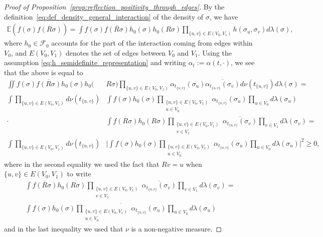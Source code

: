 \documentclass[12pt,reqno]{article}
\def\E{\mathbb{E}}
\newcommand{\cF}{\mathcal{F}}
\begin{document}
\begin{proof}[Proof of Proposition~\ref{prop:reflection_positivity_through_edges}]
	By the definition~\eqref{eq:def_density_general_interaction} of the density of $\sigma$, we have
	\begin{align*}
	\E\left(f(\sigma) \overline{f(R\sigma)}\right) = \int f(\sigma) \overline{f(R\sigma)} h_0(\sigma) h_0(R\sigma) \prod_{\{u,v\} \in E(V_0,V_1)} h(\sigma_u,\sigma_v) d\lambda(\sigma) ,
	\end{align*}
	where $h_0 \in \cF_0$ accounts for the part of the interaction coming from edges within $V_0$, and $E(V_0,V_1)$ denotes the set of edges between $V_0$ and $V_1$. Using the assumption \eqref{eq:h_semidefinite_representation} and writing $\alpha_t := \alpha(t,\cdot)$, we see that the above is equal to
\begin{equation*}
  \begin{split}
    \iint f(\sigma) \overline{f(R\sigma)} h_0(\sigma) h_0(&R\sigma) \prod_{\{u,v\} \in E(V_0,V_1)} \alpha_{t_{\{u,v\}}}(\sigma_u) \overline{\alpha_{t_{\{u,v\}}}(\sigma_v)} d\nu(t_{\{u,v\}}) d\lambda(\sigma) =\\
    \int \prod_{\{u,v\} \in E(V_0,V_1)}d\nu(t_{\{u,v\}})&\int f(\sigma)h_0(\sigma)\prod_{\substack{\{u,v\} \in E(V_0,V_1)\\u\in V_0}} \alpha_{t_{\{u,v\}}}(\sigma_u)\prod_{u\in V_0} d\lambda(\sigma_u)\\
    \cdot&\int \overline{f(R\sigma)}h_0(R\sigma)\prod_{\substack{\{u,v\} \in E(V_0,V_1)\\v\in V_1}} \overline{\alpha_{t_{\{u,v\}}}(\sigma_v)}\prod_{v\in V_1} d\lambda(\sigma_v) =\\
    \int \prod_{\{u,v\} \in E(V_0,V_1)}d\nu(t_{\{u,v\}})&\bigg|\int f(\sigma)h_0(\sigma)\prod_{\substack{\{u,v\} \in E(V_0,V_1)\\ u\in V_0}} \alpha_{t_{\{u,v\}}}(\sigma_u)\prod_{u\in V_0} d\lambda(\sigma_u)\bigg|^2\ge 0,
  \end{split}
\end{equation*}
where in the second equality we used the fact that $Rv=u$ when $\{u,v\} \in E(V_0,V_1)$ to write
\begin{multline*}
  \int \overline{f(R\sigma)}h_0(R\sigma)\prod_{\substack{\{u,v\} \in E(V_0,V_1)\\v\in V_1}} \overline{\alpha_{t_{\{u,v\}}}(\sigma_v)}\prod_{v\in V_1} d\lambda(\sigma_v)=\\
  \overline{\int f(\sigma)h_0(\sigma)\prod_{\substack{\{u,v\} \in E(V_0,V_1)\\u\in V_0}} \alpha_{t_{\{u,v\}}}(\sigma_u)\prod_{u\in V_0} d\lambda(\sigma_u)}
\end{multline*}
and in the last inequality we used that $\nu$ is a non-negative measure.
\end{proof}
\end{document}
